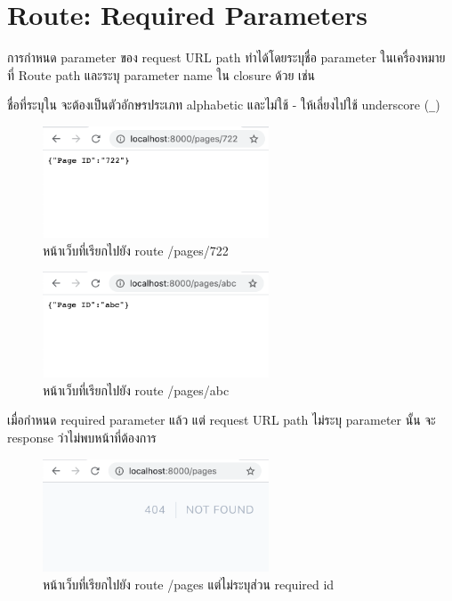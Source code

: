 \section{Route: Required Parameters}
การกำหนด parameter ของ request URL path ทำได้โดยระบุชื่อ parameter ในเครื่องหมาย \texttt{{}} ที่ Route path 
และระบุ parameter name ใน closure ด้วย เช่น


ชื่อที่ระบุใน \texttt{{}} จะต้องเป็นตัวอักษรประเภท alphabetic และไม่ใช้ - ให้เลี่ยงไปใช้ underscore (\texttt{_})

\begin{figure}[h!]
    \centering
    \includegraphics[width=0.6\textwidth]{images/ch3/04.png}
    \caption{หน้าเว็บที่เรียกไปยัง route /pages/722}
\end{figure}

\begin{figure}[h!]
    \centering
    \includegraphics[width=0.6\textwidth]{images/ch3/05.png}
    \caption{หน้าเว็บที่เรียกไปยัง route /pages/abc}
\end{figure}

เมื่อกำหนด required parameter แล้ว แต่ request URL path ไม่ระบุ parameter นั้น
จะ response ว่าไม่พบหน้าที่ต้องการ

\begin{figure}[h!]
    \centering
    \includegraphics[width=0.6\textwidth]{images/ch3/06.png}
    \caption{หน้าเว็บที่เรียกไปยัง route /pages แต่ไม่ระบุส่วน required id}
\end{figure}

